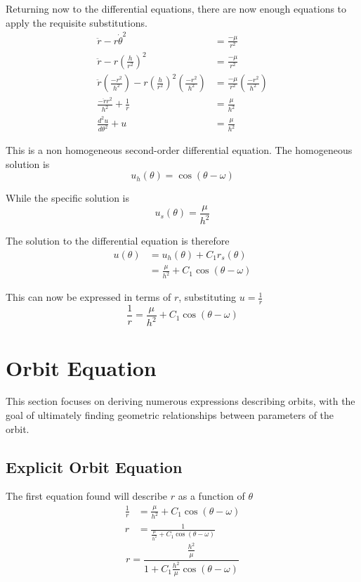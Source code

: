 \documentclass{article}
\begin{document}
Returning now to the differential equations, there are now enough equations to apply the requisite substitutions.
\begin{align*}
    \ddot{r}-r\dot{\theta}^2                                        & =\frac{-\mu}{r^2}                   \\
    \ddot{r}-r(\frac{h}{r^2})^2                                     & =\frac{-\mu}{r^2}                   \\
    \ddot{r}(\frac{-r^2}{h^2})-r(\frac{h}{r^2})^2(\frac{-r^2}{h^2}) & =\frac{-\mu}{r^2}(\frac{-r^2}{h^2}) \\
    \frac{-\ddot{r}r^2}{h^2}+\frac{1}{r}                            & =\frac{\mu}{h^2}                    \\
    \frac{d^2u}{d\theta^2}+u                                        & =\frac{\mu}{h^2}
\end{align*}

This is a non homogeneous second-order differential equation. The homogeneous solution is
$$u_h(\theta)=\cos(\theta-\omega)$$

While the specific solution is
$$u_s(\theta)=\frac{\mu}{h^2}$$

The solution to the differential equation is therefore
\begin{align*}
    u(\theta) & =u_h(\theta)+C_1r_s(\theta)             \\
              & =\frac{\mu}{h^2}+C_1\cos(\theta-\omega)
\end{align*}

This can now be expressed in terms of $r$, substituting $u=\frac{1}{r}$
\begin{equation}\label{1/r in terms of theta}
    \frac{1}{r}=\frac{\mu}{h^2}+C_1\cos(\theta-\omega)
\end{equation}

\section{Orbit Equation}

This section focuses on deriving numerous expressions describing orbits, with the goal of ultimately finding geometric relationships between parameters of the orbit.

\bigskip\bigskip
\subsection{Explicit Orbit Equation}

The first equation found will describe $r$ as a function of $\theta$
\begin{align*}
    \frac{1}{r} & =\frac{\mu}{h^2}+C_1\cos(\theta-\omega)           \\
    r           & =\frac{1}{\frac{\mu}{h^2}+C_1\cos(\theta-\omega)}
\end{align*}
\begin{equation}\label{Polar with h, mu, C}
    r=\frac{\frac{h^2}{\mu}}{1+C_1\frac{h^2}{\mu}\cos(\theta-\omega)}
\end{equation}
\end{document}
